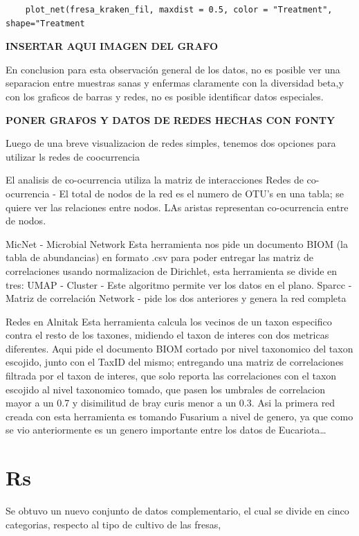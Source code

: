 \begin{lstlisting}
    plot_net(fresa_kraken_fil, maxdist = 0.5, color = "Treatment", shape="Treatment
\end{lstlisting}

\textbf{INSERTAR AQUI IMAGEN DEL GRAFO}

En conclusion para esta observación general de los datos, no es posible ver una separacion entre muestras
sanas y enfermas claramente con la diversidad beta,y con los graficos de barras y redes, no es posible
identificar datos especiales.




\textbf{PONER GRAFOS Y DATOS DE REDES HECHAS CON FONTY}

Luego de una breve visualizacion de redes simples, tenemos dos opciones para utilizar ls redes de coocurrencia

El analisis de co-ocurrencia utiliza la matriz de interacciones
Redes de co-ocurrencia - El total de nodos de la red es el numero de OTU's en una tabla; se quiere ver las relaciones entre nodos. LAs aristas representan co-ocurrencia entre de nodos.

MicNet - Microbial Network
Esta herramienta nos pide un documento BIOM (la tabla de abundancias) en formato .csv para poder entregar las matriz de correlaciones usando normalizacion de Dirichlet, esta herramienta se divide en tres: 
UMAP - Cluster - Este algoritmo permite ver los datos en el plano.
Sparcc - Matriz de correlación
Network - pide los dos anteriores y genera la red completa

Redes en Alnitak
Esta herramienta calcula los vecinos de un taxon especifico contra el resto de los taxones, midiendo el taxon de interes con dos metricas diferentes.
Aqui pide el documento BIOM cortado por nivel taxonomico del taxon escojido, junto con el TaxID del mismo; entregando una matriz de correlaciones filtrada por el taxon de interes, que solo reporta las correlaciones con el taxon escojido al nivel taxonomico tomado, que pasen los umbrales de correlacion mayor a un 0.7 y disimilitud de bray curis menor a un 0.3. 
Asi la primera red creada con esta herramienta es tomando Fusarium a nivel de genero, ya que como se vio anteriormente es un genero importante entre los datos de Eucariota…





\section{Rs}

Se obtuvo un nuevo conjunto de datos complementario, el cual se divide en cinco categorias, respecto al tipo de cultivo de las fresas,


